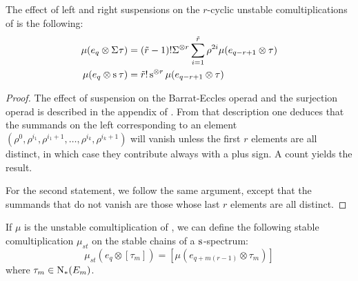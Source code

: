 \begin{proposition}\label{prop:suspensionunstable}
    The effect of left and right suspensions on the $r$-cyclic unstable comultiplications of \cite{medina2021may_st} is the following:
    \begin{align*}
        \mu(e_q\otimes \Sigma^{} \tau) &= (\tilde{r}-1)!\Sigma^{\otimes r}\sum_{i=1}^{\tilde{r}} \rho^{2i}\mu(e_{q-r+1}\otimes \tau) 
        \\
       \mu(e_q\otimes \operatorname{s}^{}\tau) &= \tilde{r}!\operatorname{s}^{\otimes r}\mu(e_{q-r+1}\otimes \tau)
    \end{align*}
\end{proposition}
\begin{proof}
    The effect of suspension on the Barrat-Eccles operad and the surjection operad is described in the appendix of \cite{berger2004combinatorial}. From that description one deduces that the summands on the left corresponding to an element $(\rho^0,\rho^{i_1},\rho^{i_1+1},\ldots,\rho^{i_k},\rho^{i_k+1})$ will vanish unless the first $r$ elements are all distinct, in which case they contribute always with a plus sign. A count yields the result. 

    For the second statement, we follow the same argument, except that the summands that do not vanish are those whose last $r$ elements are all distinct.
\end{proof}

\begin{corollary}
    If $\mu$ is the unstable comultiplication of \cite{medina2021may_st}, we can define the following stable comultiplication $\mu_{st}$ on the stable chains of a $\operatorname{s}^{}$-spectrum:
    \[
        \mu_{st}(e_q\otimes [\tau_m]) = [\mu(e_{q+m(r-1)}\otimes \tau_m)]
    \]
    where $\tau_m\in \operatorname{N}_*(E_m)$.
\end{corollary}

